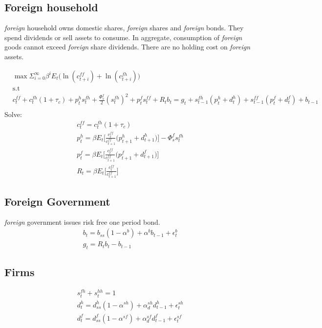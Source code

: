 \documentclass[a4paper]{article}
\begin{document}
\subsection{Foreign household}
\emph{foreign} household owns domestic shares, \emph{foreign} shares and \emph{foreign} bonds. They spend dividends or sell assets to consume. In aggregate, consumption of \emph{foreign} goods cannot exceed \emph{foreign} share dividends. There are no holding cost on \emph{foreign} assets. 

\begin{align*}
&\max \Sigma_{i=0}^\infty \beta^i E_t \bigg(\ln(c^{ff}_{t+i})+ \ln(c^{fh}_{t+i}) \bigg)\\ &\text{s.t}\\
&c^{ff}_t+c^{fh}_t(1+\tau_c)+ p^{h}_t s^{fh}_t+\frac{\Phi^f_s}{2}(s^{fh}_t)^2 + p^{f}_t s^{ff}_t+ R_t b_t=g_t+s^{fh}_{t-1}(p^{h}_t+d^{h}_t)+s^{ff}_{t-1}(p^{f}_t+d^{f}_t)+b_{t-1}\\
\end{align*}
Solve:
\begin{align}
&c^{ff}_t=c^{fh}_t(1+\tau_c)\\
&p^{h}_t=\beta E_t \bigg[\frac{c^{ff}_t}{c^{ff}_{t+1}} \bigg(  p^{h}_{t+1}+d^{h}_{t+1} \bigg) \bigg] - \Phi^{f}_s s^{fh}_t\\
&p^{f}_t=\beta E_t \bigg[\frac{c^{ff}_t}{c^{ff}_{t+1}} \bigg(  p^{f}_{t+1}+d^{f}_{t+1} \bigg) \bigg]\\
&R_t=\beta E_t \bigg[\frac{c^{ff}_t}{c^{ff}_{t+1}} \bigg] 
\end{align}













\subsection{Foreign Government}
\emph{foreign} government issues risk free one period bond.
\begin{align}
&b_{t} = b_{ss}(1-\alpha^b) + \alpha^b b_{t-1} + \epsilon^b_t\\
&g_t	   = R_t b_{t}-b_{t-1}
\end{align}


\subsection{Firms}
\begin{align}
&s^{fh}_t+s^{hh}_t=1\\
&d^h_t=d^h_{ss} (1-\alpha^{sh}) +\alpha^{sh}_d d^h_{t-1} + \epsilon^{sh}_{t}\\
&d^f_t=d^f_{ss} (1-\alpha^{sf}) +\alpha^{sf}_d d^f_{t-1} + \epsilon^{sf}_{t}\\
\end{align}
\end{document}
